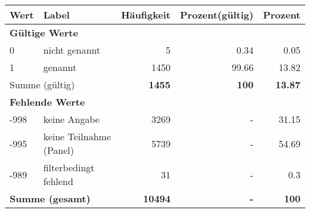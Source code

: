      \begin{longtable}{lXrrr}
     \toprule
     \textbf{Wert} & \textbf{Label} & \textbf{Häufigkeit} & \textbf{Prozent(gültig)} & \textbf{Prozent} \\
     \endhead
     \midrule
     \multicolumn{5}{l}{\textbf{Gültige Werte}}\\

     0 &
     \multicolumn{1}{X}{ nicht genannt   } &


       \num{5} &
       \num[round-mode=places,round-precision=2]{0.34} &
         \num[round-mode=places,round-precision=2]{0.05} \\

     1 &
     \multicolumn{1}{X}{ genannt   } &


       \num{1450} &
       \num[round-mode=places,round-precision=2]{99.66} &
         \num[round-mode=places,round-precision=2]{13.82} \\
     \midrule
     \multicolumn{2}{l}{Summe (gültig)} &
       \textbf{\num{1455}} &
     \textbf{\num{100}} &
       \textbf{\num[round-mode=places,round-precision=2]{13.87}} \\
     \multicolumn{5}{l}{\textbf{Fehlende Werte}}\\
       -998 &
       keine Angabe &
         \num{3269} &
        - &
         \num[round-mode=places,round-precision=2]{31.15} \\
       -995 &
       keine Teilnahme (Panel) &
         \num{5739} &
        - &
         \num[round-mode=places,round-precision=2]{54.69} \\
       -989 &
       filterbedingt fehlend &
         \num{31} &
        - &
         \num[round-mode=places,round-precision=2]{0.3} \\
     \midrule
     \multicolumn{2}{l}{\textbf{Summe (gesamt)}} &
          \textbf{\num{10494}} &
        \textbf{-} &
        \textbf{\num{100}} \\
     \bottomrule
     \end{longtable}
     

